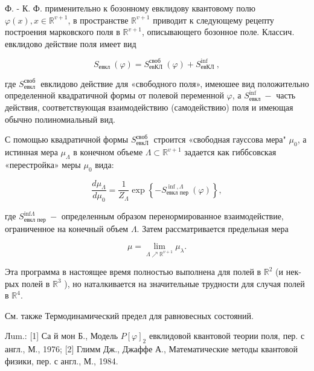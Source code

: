 \documentclass[10pt]{article}
\begin{document}
Ф. - К. Ф. применительно к бозонному евклидову квантовому полю $\varphi(x), x \in \mathbb{R}^{v+1}$, в пространстве $\mathbb{R}^{v+1}$ приводит к следующему рецепту построения марковского поля в $\mathbb{R}^{v+1}$, описывающего бозонное поле. Классич. евклидово действие поля имеет вид



\[

S_{\text {евкл }}(\varphi)=S_{\text {евКЛ }}^{\text {своб }}(\varphi)+S_{\text {евКЛ }}^{\inf },

\]



где $S_{\text {евкл }}^{\text {своб }}$ евклидово действие для «свободного поля», имеюшее вид положительно определенной квадратичной формы от полевой переменной $\varphi$, а $S_{\text {евкл }}^{\mathrm{inf}}-$ часть действия, соответствующая взаимодействию (самодействию) поля и имеющая обычно полиномиальный вид.



С помощью квадратичной формы $S_{\text {евкЛ }}^{\text {своб }}$ строится «свободная гауссова мера" $\mu_{0}$, а истинная мера $\mu_{\Lambda}$ в конечном объеме $\Lambda \subset \mathbb{R}^{v+1}$ задается как гиббсовская «перестройка» меры $\mu_{0}$ вида:



\[

\frac{d \mu_{\Lambda}}{d \mu_{0}}=\frac{1}{Z_{\Lambda}} \exp \left\{-S_{\text {евкл пер }}^{\inf , \Lambda}(\varphi)\right\},

\]



где $S_{\text {евкл пер }}^{\mathrm{inf} \Lambda}-$ определенным образом перенормированное взаимодействие, ограниченное на конечный объем $\Lambda$. Затем рассматривается предельная мера



\[

\mu=\lim _{\Lambda \nearrow \mathbb{R}^{v+1}} \mu_{\lambda} .

\]



Эта программа в настоящее время полностью выполнена для полей в $\mathbb{R}^{2}$ (и нек-рых полей в $\mathbb{R}^{3}$ ), но наталкивается на значительные трудности для случая полей в $\mathbb{R}^{4}$.



См. также Термодинамический предел для равновесных состояний.



Лum.: [1] Са й мон Б., Модель $P[\varphi]_{2}$ евклидовой квантовой теории поля, пер. с англ., М., 1976; [2] Глимм Дж., Джаффе А., Математические методы квантовой физики, пер. с англ., М., 1984.
\end{document}

